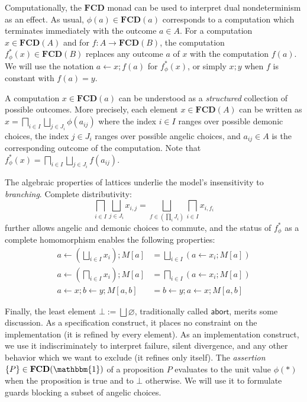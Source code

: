 \documentclass[draft,11pt]{report}
\newcommand{\kw}[1]{\ensuremath{ \mathsf{#1} }}
\begin{document}
Computationally,
the $\mathbf{FCD}$ monad can be used to interpret
dual nondeterminism as an effect.
As usual,
$\phi(a) \in \mathbf{FCD}(a)$
corresponds to a computation which
terminates immediately with the outcome $a \in A$.
For a computation $x \in \mathbf{FCD}(A)$
and for $f : A \rightarrow \mathbf{FCD}(B)$,
the computation $f_\phi^*(x) \in \mathbf{FCD}(B)$
replaces
any outcome $a$ of $x$ with the computation $f(a)$.
We will use the notation
$a \leftarrow x ; f(a)$ for $f^*_\phi(x)$,
or simply $x ; y$ when $f$ is constant with $f(a) = y$.

A computation $x \in \mathbf{FCD}(a)$
can be understood as
a \emph{structured} collection of possible outcomes.
More precisely,
each element $x \in \mathbf{FCD}(A)$ can be written as
$
    x = \bigsqcap_{i \in I} \bigsqcup_{j \in J_i} \phi(a_{ij})
$
where
the index $i \in I$ ranges over possible demonic choices,
the index $j \in J_i$ ranges over possible angelic choices,
and $a_{ij} \in A$ is the corresponding outcome of the computation.
Note that
$f_\phi^*(x) = \bigsqcap_{i \in I} \bigsqcup_{j \in J_i} f(a_{ij})$.

The algebraic properties of lattices
underlie the model's insensitivity to \emph{branching}.
Complete distributivity:
\[
    \bigsqcap_{i \in I} \bigsqcup_{j \in J_i} x_{i,j} =
    \bigsqcup_{f \in (\prod_i J_i)} \bigsqcap_{i \in I} x_{i, f_i}
\]
further allows angelic and demonic choices to commute,
and the status of $f^*_\phi$ as a complete homomorphism
enables the following properties:
\begin{align*}
    a \leftarrow \left( \bigsqcup_{i \in I} x_i \right) ; M[a] &=
      \bigsqcup_{i \in I} (a \leftarrow x_i ; M[a])
    \\
    a \leftarrow \left( \bigsqcap_{i \in I} x_i \right) ; M[a] &=
      \bigsqcap_{i \in I} (a \leftarrow x_i ; M[a])
    \\
    a \leftarrow x ; b \leftarrow y ; M[a,b] &=
    b \leftarrow y ; a \leftarrow x ; M[a,b]
\end{align*}

Finally,
the least element $\bot := \bigsqcup \varnothing$,
traditionally called $\kw{abort}$,
merits some discussion.
As a specification construct,
it places no constraint on the implementation
(it is refined by every element).
As an implementation construct,
we use it indiscriminately to interpret
failure, silent divergence,
and any other behavior
which we want to exclude (it refines only itself).
The \emph{assertion} $\{P\} \in \mathbf{FCD}(\mathbbm{1})$ of a proposition $P$
evaluates to the unit value $\phi(*)$ when the proposition is true
and to $\bot$ otherwise.
We will use it to formulate guards
blocking a subset of angelic choices.
\end{document}
